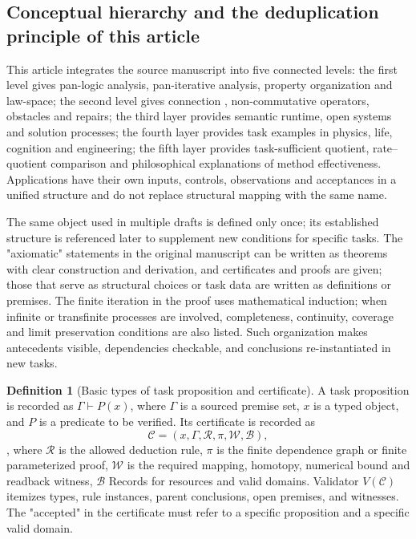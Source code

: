\documentclass[11pt,a4paper]{article}
\theoremstyle{plain}
\theoremstyle{definition}
\newtheorem{definition}[theorem]{Definition}
\theoremstyle{remark}
\begin{document}
\begin{CJK*}
\subsection { Conceptual hierarchy and the deduplication principle of this article } This article integrates the source manuscript into five connected levels: the first level gives pan-logic analysis, pan-iterative analysis, property organization and law-space; the second level gives connection , non-commutative operators, obstacles and repairs; the third layer provides semantic runtime, open systems and solution processes; the fourth layer provides task examples in physics, life, cognition and engineering; the fifth layer provides task-sufficient quotient, rate--quotient comparison and philosophical explanations of method effectiveness. Applications have their own inputs, controls, observations and acceptances in a unified structure and do not replace structural mapping with the same name.

The same object used in multiple drafts is defined only once; its established structure is referenced later to supplement new conditions for specific tasks. The "axiomatic" statements in the original manuscript can be written as theorems with clear construction and derivation, and certificates and proofs are given; those that serve as structural choices or task data are written as definitions or premises. The finite iteration in the proof uses mathematical induction; when infinite or transfinite processes are involved, completeness, continuity, coverage and limit preservation conditions are also listed. Such organization makes antecedents visible, dependencies checkable, and conclusions re-instantiated in new tasks.

\begin{definition}
[Basic types of task proposition and certificate]\label{def:task-certificate}
A task proposition is recorded as $\Gamma\vdash P(x)$, where $\Gamma$ is a sourced premise set, $x$ is a typed object, and $P$ is a predicate to be verified. Its certificate is recorded as \[
\mathcal C=(x,\Gamma,\mathcal R,\pi,\mathcal W,\mathcal B),
\], where $\mathcal R$ is the allowed deduction rule, $\pi$ is the finite dependence graph or finite parameterized proof, $\mathcal W$ is the required mapping, homotopy, numerical bound and readback witness, $\mathcal B$ Records for resources and valid domains. Validator $V(\mathcal C)$ itemizes types, rule instances, parent conclusions, open premises, and witnesses. The "accepted" in the certificate must refer to a specific proposition and a specific valid domain.\end{definition}



\end{CJK*}
\end{document}
